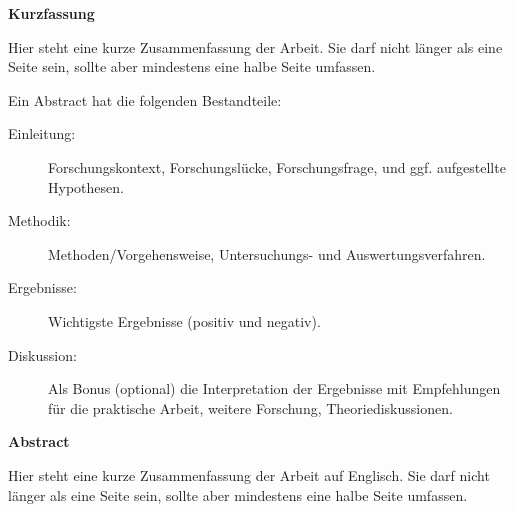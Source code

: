 \vspace*{2cm}

\begin{center}
    \textbf{Kurzfassung}
\end{center}

\vspace*{1cm}

\noindent Hier steht eine kurze Zusammenfassung der Arbeit. Sie darf nicht länger als eine Seite sein, sollte aber mindestens eine halbe Seite umfassen.

Ein Abstract hat die folgenden Bestandteile:
\begin{description}
\item[Einleitung:] Forschungskontext, Forschungslücke, Forschungsfrage, und ggf. aufgestellte Hypothesen.
\item[Methodik:] Methoden/Vorgehensweise, Untersuchungs- und Auswertungsverfahren.
\item[Ergebnisse:] Wichtigste Ergebnisse (positiv und negativ).
\item[Diskussion:] Als Bonus (optional) die Interpretation der Ergebnisse mit Empfehlungen für die praktische Arbeit, weitere Forschung, Theoriediskussionen.
\end{description}

\vspace*{2cm}

\begin{center}
    \textbf{Abstract}
\end{center}

\vspace*{1cm}

\noindent Hier steht eine kurze Zusammenfassung der Arbeit auf Englisch. Sie darf nicht länger als eine Seite sein, sollte aber mindestens eine halbe Seite umfassen.

